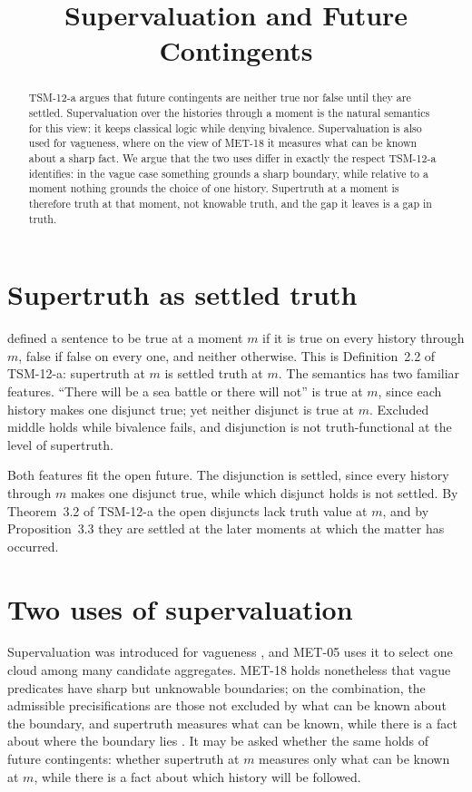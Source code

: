 \documentclass{situationist-preprint}
\title{Supervaluation and Future Contingents}
\begin{document}
\maketitle

\begin{abstract}
TSM-12-a argues that future contingents are neither true nor false until they are settled. Supervaluation over the histories through a moment is the natural semantics for this view: it keeps classical logic while denying bivalence. Supervaluation is also used for vagueness, where on the view of MET-18 it measures what can be known about a sharp fact. We argue that the two uses differ in exactly the respect TSM-12-a identifies: in the vague case something grounds a sharp boundary, while relative to a moment nothing grounds the choice of one history. Supertruth at a moment is therefore truth at that moment, not knowable truth, and the gap it leaves is a gap in truth.
\end{abstract}

\section{Supertruth as settled truth}

\citet{Thomason1970} defined a sentence to be true at a moment $m$ if it is true on every history through $m$, false if false on every one, and neither otherwise. This is Definition~2.2 of TSM-12-a: supertruth at $m$ is settled truth at $m$. The semantics has two familiar features. \enquote{There will be a sea battle or there will not} is true at $m$, since each history makes one disjunct true; yet neither disjunct is true at $m$. Excluded middle holds while bivalence fails, and disjunction is not truth-functional at the level of supertruth.

Both features fit the open future. The disjunction is settled, since every history through $m$ makes one disjunct true, while which disjunct holds is not settled. By Theorem~3.2 of TSM-12-a the open disjuncts lack truth value at $m$, and by Proposition~3.3 they are settled at the later moments at which the matter has occurred.

\section{Two uses of supervaluation}

Supervaluation was introduced for vagueness \citep{Fine1975}, and MET-05 uses it to select one cloud among many candidate aggregates. MET-18 holds nonetheless that vague predicates have sharp but unknowable boundaries; on the combination, the admissible precisifications are those not excluded by what can be known about the boundary, and supertruth measures what can be known, while there is a fact about where the boundary lies \citep{Williamson1994}. It may be asked whether the same holds of future contingents: whether supertruth at $m$ measures only what can be known at $m$, while there is a fact about which history will be followed.
\end{document}
